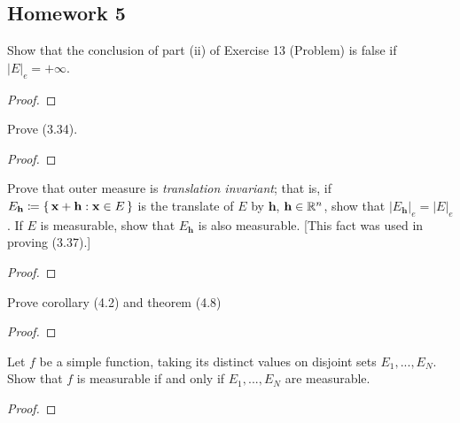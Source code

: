 \subsection{Homework 5}
\begin{problem}
Show that the conclusion of part  (ii) of Exercise 13 (Problem) is false if
$|E|_e=+\infty$.
\end{problem}
\begin{proof}
\end{proof}

\begin{problem}
Prove (3.34).
\end{problem}
\begin{proof}
\end{proof}

\begin{problem}
Prove that outer measure is \emph{translation invariant}; that is, if
$E_{\textbf{h}}\coloneq\left\{\,\mathbf{x}+\mathbf{h}:\mathbf{x}\in
  E\,\right\}$ is the translate of $E$ by $\mathbf{h}$,
$\mathbf{h}\in\mathbb{R}^n$, show that
$|E_{\mathbf{h}}|_e=|E|_e$. If $E$ is measurable,
show that $E_{\mathbf{h}}$ is also measurable. [This fact was used in
proving (3.37).]
\end{problem}
\begin{proof}
\end{proof}

\begin{problem}
Prove corollary (4.2) and theorem (4.8)
\end{problem}
\begin{proof}
\end{proof}

\begin{problem}
Let $f$ be a simple function, taking its distinct values on disjoint sets
$E_1,...,E_N$. Show that $f$ is measurable if and only if $E_1,...,E_N$ are
measurable.
\end{problem}
\begin{proof}
\end{proof}

